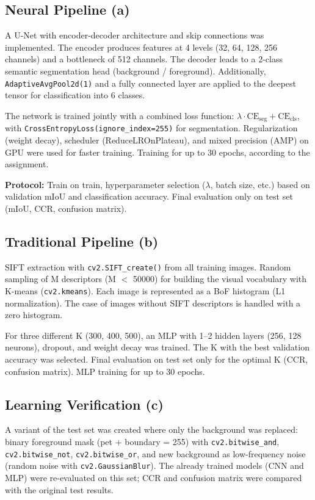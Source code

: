 \documentclass{article}
\begin{document}
\subsection{Neural Pipeline (a)}

A U-Net with encoder-decoder architecture and skip connections was implemented. The encoder produces features at 4 levels (32, 64, 128, 256 channels) and a bottleneck of 512 channels. The decoder leads to a 2-class semantic segmentation head (background / foreground). Additionally, \texttt{AdaptiveAvgPool2d(1)} and a fully connected layer are applied to the deepest tensor for classification into 6 classes.

The network is trained jointly with a combined loss function: $\lambda \cdot \text{CE}_{\text{seg}} + \text{CE}_{\text{cls}}$, with \texttt{CrossEntropyLoss(ignore\_index=255)} for segmentation. Regularization (weight decay), scheduler (ReduceLROnPlateau), and mixed precision (AMP) on GPU were used for faster training. Training for up to 30 epochs, according to the assignment.

\textbf{Protocol:} Train on train, hyperparameter selection ($\lambda$, batch size, etc.) based on validation mIoU and classification accuracy. Final evaluation only on test set (mIoU, CCR, confusion matrix).

\subsection{Traditional Pipeline (b)}

SIFT extraction with \texttt{cv2.SIFT\_create()} from all training images. Random sampling of M descriptors (M $<$ 50000) for building the visual vocabulary with K-means (\texttt{cv2.kmeans}). Each image is represented as a BoF histogram (L1 normalization). The case of images without SIFT descriptors is handled with a zero histogram.

For three different K (300, 400, 500), an MLP with 1--2 hidden layers (256, 128 neurons), dropout, and weight decay was trained. The K with the best validation accuracy was selected. Final evaluation on test set only for the optimal K (CCR, confusion matrix). MLP training for up to 30 epochs.

\subsection{Learning Verification (c)}

A variant of the test set was created where only the background was replaced: binary foreground mask (pet + boundary = 255) with \texttt{cv2.bitwise\_and}, \texttt{cv2.bitwise\_not}, \texttt{cv2.bitwise\_or}, and new background as low-frequency noise (random noise with \texttt{cv2.GaussianBlur}). The already trained models (CNN and MLP) were re-evaluated on this set; CCR and confusion matrix were compared with the original test results.
\end{document}
